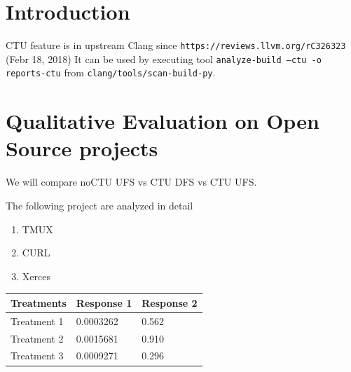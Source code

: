 \documentclass[a0,portrait]{a0poster}
\begin{document}
\begin{multicols}{2}
\begin{abstract}
\end{abstract}


\color{SaddleBrown} %

\section*{Introduction}
CTU feature is in upstream Clang since \texttt{https://reviews.llvm.org/rC326323} (Febr 18, 2018)
It can be used by executing tool \texttt{analyze-build --ctu -o reports-ctu} from \texttt{clang/tools/scan-build-py}.


\color{DarkSlateGray} %

\section*{Qualitative Evaluation on Open Source projects}

We will compare noCTU UFS vs CTU DFS vs CTU UFS.


The following project are analyzed in detail


\begin{enumerate}
\item TMUX
\item CURL
\item Xerces
\end{enumerate}


%
\begin{table} %
\begin{tabular}{l l l}
\toprule
\textbf{Treatments} & \textbf{Response 1} & \textbf{Response 2}\\
\midrule
Treatment 1 & 0.0003262 & 0.562 \\
Treatment 2 & 0.0015681 & 0.910 \\
Treatment 3 & 0.0009271 & 0.296 \\
\bottomrule
\end{tabular}
\end{table}
%


\end{multicols}
\end{document}
